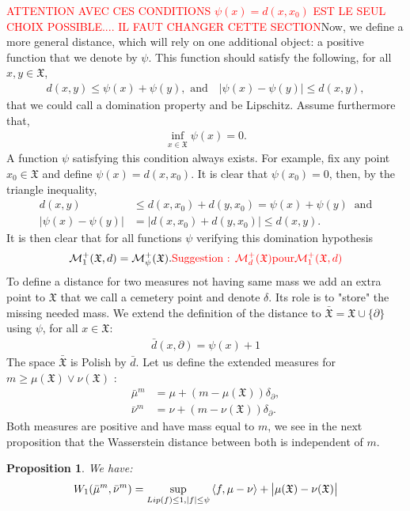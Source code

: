 \documentclass[11pt,a4paper]{article}
\newcommand{\MC}{\mathcal{M}}
\newcommand{\XF}{\mathfrak{X}}
\newcommand{\red}[1]{\textcolor{red}{#1}}
\newcommand{\brac}[1]{\left\langle#1\right\rangle}
\newtheorem{proposition}[theorem]{Proposition}
\begin{document}
\red{ATTENTION AVEC CES CONDITIONS $\psi(x) = d(x,x_0)$ EST LE SEUL CHOIX POSSIBLE.... IL FAUT CHANGER CETTE SECTION}Now, we define a more general distance, which will rely on one additional object: a positive function that we denote by $\psi$. This function should satisfy the following, for all $x,y \in \XF$,
\begin{align*}
    d(x,y) \leq \psi(x) + \psi(y), \text{ and}\quad|\psi(x) - \psi(y)| \leq d(x,y),
\end{align*}
that we could call a domination property and be Lipschitz. Assume furthermore that,
\begin{align*}
    \inf\limits_{x \in \XF} \psi(x) = 0.
\end{align*}
A function $\psi$ satisfying this condition always exists. For example, fix any point $x_0 \in \XF$ and define $\psi(x) = d(x,x_0)$. It is clear that $\psi(x_0) = 0$, then, by the triangle inequality,
\begin{align*}
d(x,y) &\leq d(x,x_0) + d(y,x_0) = \psi(x) + \psi(y)\ \text{ and}\\
|\psi(x) - \psi(y)| &= |d(x,x_0) + d(y,x_0)| \leq d(x,y).
\end{align*}
It is then clear that for all functions $\psi$ verifying this domination hypothesis
\[
\MC^+_1(\XF,d) = \MC^+_{\psi}(\XF). \red{\text{Suggestion : } \MC^+_d(\XF) \text{pour} \MC^+_1(\XF,d)}
\]
To define a distance for two measures not having same mass we add an extra point to $\XF$ that we call a cemetery point and denote $\delta$. Its role is to "store" the missing needed mass. We extend the definition of the distance to $\bar{\XF} = \XF\cup \lbrace\partial\rbrace$ using $\psi$, for all $x \in \XF$:
\begin{align*}
    \bar{d}(x,\partial) = \psi(x) + 1
\end{align*}
The space $\bar{\XF}$ is Polish by $\bar{d}$. Let us define the extended measures for $m\geq \mu(\XF) \vee \nu(\XF)$ :
\begin{align*}
    \bar{\mu}^m &= \mu + (m-\mu(\XF))\delta_{\partial}, \\
    \bar{\nu}^m &= \nu + (m-\nu(\XF))\delta_{\partial}.
\end{align*}
Both measures are positive and have mass equal to $m$, we see in the next proposition that the Wasserstein distance between both is independent of $m$.
\begin{proposition}\label{prop:Kantorovich-general}
    We have:
    \begin{align*}
        W_1(\bar{\mu}^m,\bar{\nu}^m) = \sup\limits_{Lip(f) \leq 1, |f| \leq \psi} \brac{f,\mu - \nu} + \left|\vphantom{A^2}\mu(\XF) - \nu(\XF) \right|
    \end{align*}
\end{proposition}
\end{document}
